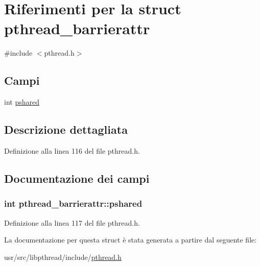 \hypertarget{structpthread__barrierattr}{\section{Riferimenti per la struct pthread\+\_\+barrierattr}
\label{structpthread__barrierattr}
}


{\ttfamily \#include $<$pthread.\+h$>$}

\subsection*{Campi}
\begin{DoxyCompactItemize}
\item 
int \hyperlink{structpthread__barrierattr_a50ef34671e6743cc59c895dd878c4a86}{pshared}
\end{DoxyCompactItemize}


\subsection{Descrizione dettagliata}


Definizione alla linea 116 del file pthread.\+h.



\subsection{Documentazione dei campi}
\hypertarget{structpthread__barrierattr_a50ef34671e6743cc59c895dd878c4a86}{
\subsubsection[{pshared}]{\setlength{\rightskip}{0pt plus 5cm}int pthread\+\_\+barrierattr\+::pshared}}\label{structpthread__barrierattr_a50ef34671e6743cc59c895dd878c4a86}


Definizione alla linea 117 del file pthread.\+h.



La documentazione per questa struct è stata generata a partire dal seguente file\+:\begin{DoxyCompactItemize}
\item 
usr/src/libpthread/include/\hyperlink{pthread_8h}{pthread.\+h}\end{DoxyCompactItemize}
